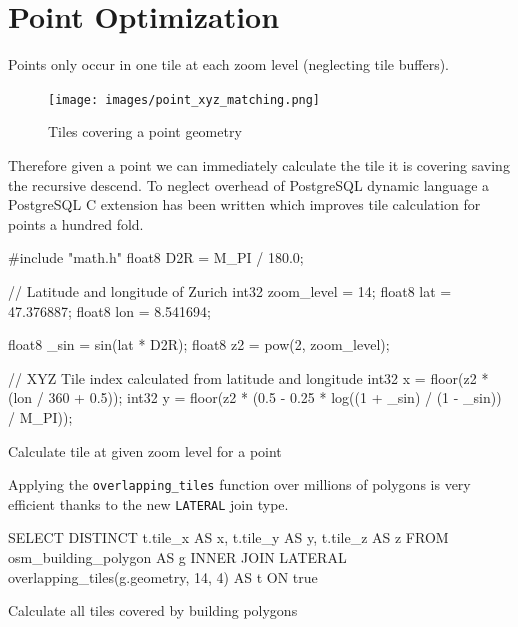 \section{Point Optimization}

Points only occur in one tile at each zoom level (neglecting tile buffers). 

\begin{figure}[H]
  \centering
  \texttt{[image: images/point\_xyz\_matching.png]}
  \caption{Tiles covering a point geometry}
\end{figure}

Therefore given a point we can immediately calculate the tile it is covering saving the recursive descend.
To neglect overhead of PostgreSQL dynamic language a PostgreSQL C extension has been written which improves tile calculation for points a hundred fold.

\begin{listing}[H]
  \centering
  \begin{ccode}
#include "math.h"
float8 D2R = M_PI / 180.0;

// Latitude and longitude of Zurich
int32 zoom_level = 14;
float8 lat = 47.376887;
float8 lon = 8.541694;

float8 _sin = sin(lat * D2R);
float8 z2 = pow(2, zoom_level);

// XYZ Tile index calculated from latitude and longitude
int32 x = floor(z2 * (lon / 360 + 0.5));
int32 y = floor(z2 * (0.5 - 0.25 * log((1 + _sin) / (1 - _sin)) / M_PI));

  \end{ccode}
  \caption{Calculate tile at given zoom level for a point}
\end{listing}

Applying the \texttt{overlapping\_tiles} function over millions of polygons is very efficient thanks to the new \texttt{LATERAL} join type.

\begin{listing}[H]
  \centering
  \begin{sqlcode}
    SELECT DISTINCT t.tile_x AS x, t.tile_y AS y, t.tile_z AS z
    FROM osm_building_polygon AS g
    INNER JOIN LATERAL overlapping_tiles(g.geometry, 14, 4) AS t ON true
  \end{sqlcode}
  \caption{Calculate all tiles covered by building polygons}
\end{listing}


